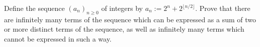 Define the sequence $(a_n)_{n\geq 0}$ of integers by $a_n:=2^n+2^{\lfloor n/2\rfloor}$.
Prove that there are infinitely many terms of the sequence which can be expressed as
a sum of two or more distinct terms of the sequence,
as well as infinitely many terms which cannot be expressed in such a way.
